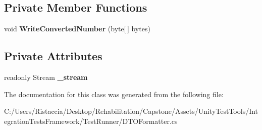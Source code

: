 \subsection*{Private Member Functions}
\begin{DoxyCompactItemize}
\item 
\mbox{\label{class_unity_test_1_1_d_t_o_formatter_1_1_writer_ae2be996f0a34ec83da14c2c1fc5a93f4}} 
void {\bfseries Write\+Converted\+Number} (byte\mbox{[}$\,$\mbox{]} bytes)
\end{DoxyCompactItemize}
\subsection*{Private Attributes}
\begin{DoxyCompactItemize}
\item 
\mbox{\label{class_unity_test_1_1_d_t_o_formatter_1_1_writer_a9c4301dfba4f63d0c8abdf28516e593b}} 
readonly Stream {\bfseries \+\_\+stream}
\end{DoxyCompactItemize}


The documentation for this class was generated from the following file\+:\begin{DoxyCompactItemize}
\item 
C\+:/\+Users/\+Ristaccia/\+Desktop/\+Rehabilitation/\+Capstone/\+Assets/\+Unity\+Test\+Tools/\+Integration\+Tests\+Framework/\+Test\+Runner/D\+T\+O\+Formatter.\+cs\end{DoxyCompactItemize}
